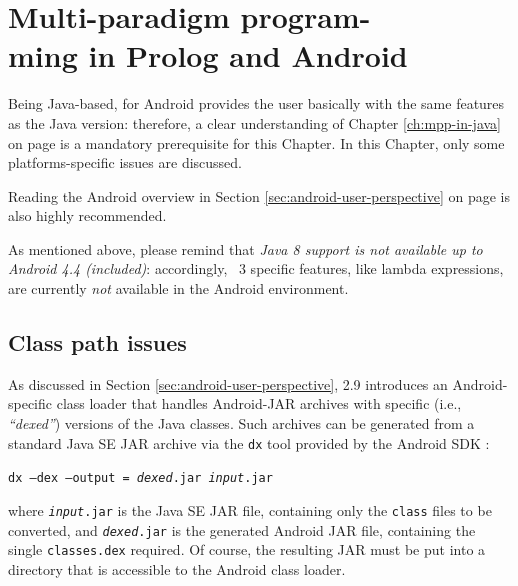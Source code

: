 \chapter[Multi-paradigm programming in Prolog and Android]{Multi-paradigm program-\\ming in Prolog and Android}
\label{ch:mpp-in-android}

Being Java-based, \tuprolog{} for Android provides the user basically with the same features as the Java version: therefore, a clear understanding of Chapter \ref{ch:mpp-in-java} on page \pageref{ch:mpp-in-java} is a mandatory prerequisite for this Chapter.
In this Chapter, only some platforms-specific issues are discussed.

Reading the Android overview in Section \ref{sec:android-user-perspective} on page \pageref{sec:android-user-perspective} is also highly recommended.

As mentioned above, please remind that \textit{Java 8 support is not available up to Android 4.4 (included)}: accordingly, \tuprolog{}~3 specific features, like lambda expressions, are currently \textit{not} available in the Android environment.

\section{Class path issues}
\label{sec:android-mpp-classloading-issues}

As discussed in Section \ref{sec:android-user-perspective}, \tuprolog{} 2.9 introduces an Android-specific class loader that handles Android-JAR archives with specific (i.e., \textit{``dexed''}) versions of the Java classes.
Such archives can be generated from a standard Java SE JAR archive via the \texttt{dx} tool provided by the Android SDK :
%
\begin{center}
\texttt{dx --dex --output = \textit{dexed}.jar \textit{input}.jar}
\end{center}
%
\noindent where \texttt{\textit{input}.jar} is the Java SE JAR file, containing only the \texttt{class} files to be converted, and \texttt{\textit{dexed}.jar} is the generated Android JAR file, containing the single \texttt{classes.dex} required.
%
Of course, the resulting JAR must be put into a directory that is accessible to the Android class loader.

